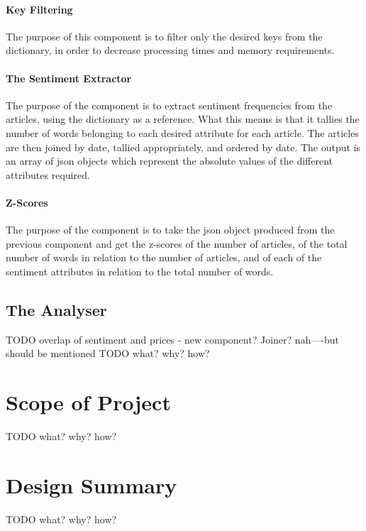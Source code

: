 \paragraph{Key Filtering}

The purpose of this component is to filter only the desired keys from the dictionary, in order to decrease processing times and memory requirements.

\paragraph{The Sentiment Extractor}

The purpose of the component is to extract sentiment frequencies from the articles, using the dictionary as a reference. What this means is that it tallies the number of words belonging to each desired attribute for each article. The articles are then joined by date, tallied appropriately, and ordered by date. The output is an array of json objects which represent the absolute values of the different attributes required.

\paragraph{Z-Scores}

The purpose of the component is to take the json object produced from the previous component and get the z-scores of the number of articles, of the total number of words in relation to the number of articles, and of each of the sentiment attributes in relation to the total number of words.

\subsection{The Analyser}
TODO overlap of sentiment and prices - new component? Joiner? nah----but should be mentioned
TODO what? why? how?

\section{Scope of Project}
TODO what? why? how?

\section{Design Summary}
TODO what? why? how?

